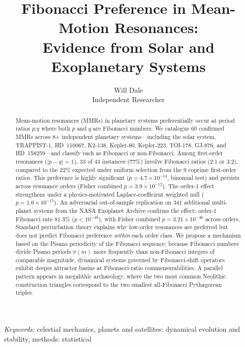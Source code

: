 \documentclass[twocolumn,11pt]{article}
\begin{document}
\title{Fibonacci Preference in Mean-Motion Resonances:\\
Evidence from Solar and Exoplanetary Systems}

\author{Will Dale\\
\small Independent Researcher}
\date{}
\maketitle

\begin{abstract}
Mean-motion resonances (MMRs) in planetary systems preferentially
occur at period ratios $p$:$q$ where both $p$ and $q$ are Fibonacci
numbers.  We catalogue 60 confirmed MMRs across 8+ independent
planetary systems---including the solar system, TRAPPIST-1, HD~110067,
K2-138, Kepler-80, Kepler-223, TOI-178, GJ-876, and HD~158259---and
classify each as Fibonacci or non-Fibonacci.  Among first-order
resonances ($|p-q|=1$), 33 of 43 instances (77\%) involve Fibonacci
ratios (2:1 or 3:2), compared to the 22\% expected under uniform
selection from the 9 coprime first-order ratios.  This preference is
highly significant ($p = 4.7 \times 10^{-14}$, binomial test) and persists across
resonance orders (Fisher combined $p = 3.9 \times 10^{-12}$).
The order-1 effect strengthens under a physics-motivated
Laplace-coefficient weighted null ($p = 1.6 \times 10^{-15}$).
An adversarial out-of-sample replication on 341 additional
multi-planet systems from the NASA Exoplanet Archive confirms the
effect: order-1 Fibonacci rate 81.3\% ($p < 10^{-48}$), with Fisher
combined $p = 3.21 \times 10^{-46}$ across orders.  Standard
perturbation theory explains why low-order resonances are preferred
but does not predict Fibonacci preference \emph{within} each order
class.  We propose a mechanism based on the Pisano periodicity of the
Fibonacci sequence: because Fibonacci numbers divide Pisano periods
$\pi(m)$ more frequently than non-Fibonacci integers of comparable
magnitude, dynamical systems governed by Fibonacci-shift operators
exhibit deeper attractor basins at Fibonacci-ratio commensurabilities.
A parallel pattern appears in megalithic archaeology, where the two
most common Neolithic construction triangles correspond to the two
smallest all-Fibonacci Pythagorean triples.
\end{abstract}

\noindent\textit{Keywords:} celestial mechanics, planets and satellites: dynamical evolution and stability, methods: statistical

\end{document}
